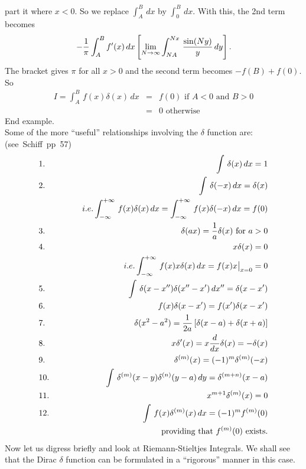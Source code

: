 part it where $x<0$. So we replace $\int_A^B\,dx$ by $\int_0^B\, dx$. With this, the 2nd term becomes 
$$- {1\over\pi} \int_A^B f'(x)\,dx \left[ \lim_{N\rightarrow\infty} \int_{NA}^{Nx} \, {\sin(Ny)\over y} \,dy \right].$$
The bracket gives $\pi$ for all $x>0$ and the second term becomes $-f(B) + f(0)$. So 
\begin{eqnarray*}
I = \int_A^B\, f(x)\delta(x)\, dx &=& f(0) \mbox{ if } A<0 \mbox{ and } B>0\\
&=& 0 \mbox{ otherwise}
\end{eqnarray*}
End example.\\

Some of the more ``useful'' relationships involving the $\delta$ function are: \hbox{(see Schiff pp 57)}
\begin{eqnarray*}
&1.~& \int\, \delta(x)\, dx  = 1\\
&2.~& \int\, \delta(-x)\, dx = \delta(x) \\
&\null&~~~~~~~~~i.e. \int_{-\infty}^{+\infty}\, f(x)\delta(x) \, dx = \int_{-\infty}^{+\infty}\, f(x)\delta(-x) \, dx = f(0)\\
&3.~& \delta(ax) = {1\over a} \delta(x) \mbox{ for } a> 0\\
&4.~& x\delta(x) = 0\\
&\null&~~~~~~~~~ i.e. \int_{-\infty}^{+\infty}\, f(x) x \delta(x) \, dx = f(x) x \big|_{x=0} = 0 \\
&5.~& \int\,\delta(x-x'')\delta(x''- x')\, dx'' = \delta(x-x')\\
&6.~& f(x)\delta(x-x') = f(x')\delta(x-x')\\
&7.~& \delta(x^2 - a^2) = {1\over2a} \left[\delta(x-a) + \delta(x+a)\right]\\
&8.~& x\delta'(x) = x{d\over dx}\delta(x) = -\delta(x)\\
&9.~& \delta^{(m)}(x) = (-1)^m \delta^{(m)}(-x)\\
&10.& \int\, \delta^{(m)}(x-y) \delta^{(n)}(y-a)\, dy = \delta^{(m+n)}(x-a)\\
&11.& x^{m+1}\delta^{(m)}(x) = 0\\
&12.& \int\, f(x) \delta^{(m)}(x)\, dx = (-1)^m f^{(m)}(0)\\
&\null&~~~~~~~~~~\mbox{ providing that } f^{(m)}(0) \mbox{ exists}.
\end{eqnarray*}
Now let us digress briefly and look at Riemann-Stieltjes Integrals.
We shall see that the Dirac $\delta$ function can be formulated in a ``rigorous'' manner in this case. 
